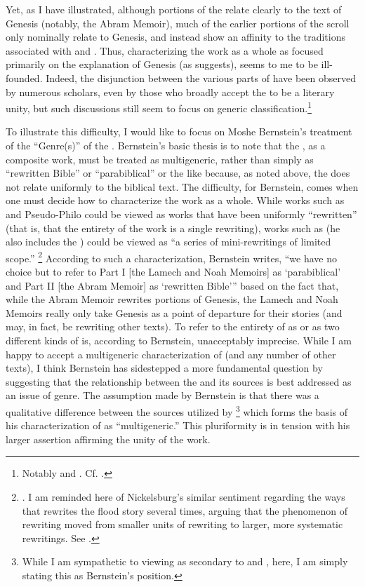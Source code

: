 Yet, as I have illustrated, although portions of the \ga relate clearly to the text of Genesis (notably, the Abram Memoir), much of the earlier portions of the scroll only nominally relate to Genesis, and instead show an affinity to the traditions associated with \firstenoch and \jub. Thus, characterizing the work as a whole as focused primarily on the explanation of Genesis (as \vermes suggests), seems to me to be ill-founded. Indeed, the disjunction between the various parts of \ga have been observed by numerous scholars, even by those who broadly accept the \ga to be a literary unity, but such discussions still seem to focus on generic classification.\footnote{Notably \cite{bernstein_as2010} and \cite{falk2007}. Cf. \cite{eshel_roitman-etal2011}.}

To illustrate this difficulty, I would like to focus on Moshe Bernstein's treatment of the ``Genre(s)'' of the \ga.\autocite[As argued in][]{bernstein_berthelot-etal2010} Bernstein's basic thesis is to note that the \ga, as a composite work, must be treated as multigeneric, rather than simply as ``rewritten Bible'' or ``parabiblical'' or the like because, as noted above, the \ga does not relate uniformly to the biblical text. The difficulty, for Bernstein, comes when one must decide how to characterize the work as a whole. While works such as \jub and Pseudo-Philo could be viewed as works that have been uniformly ``rewritten'' (that is, that the entirety of the work is a single rewriting), works such as \ga (he also includes the \templescroll) could be viewed as ``a series of mini-rewritings of limited scope.''%
%
\footnote{\cite[336]{bernstein_berthelot-etal2010}. I am reminded here of Nickelsburg's similar sentiment regarding the ways that \firstenoch rewrites the flood story several times, arguing that the phenomenon of rewriting moved from smaller units of rewriting to larger, more systematic rewritings. See \cite[89--90]{nickelsburg_stone1984}.}
%
According to such a characterization, Bernstein writes, ``we have no choice but to refer to Part I [the Lamech and Noah Memoirs] as `parabiblical' and Part II [the Abram Memoir] as `rewritten Bible''' based on the fact that, while the Abram Memoir rewrites portions of Genesis, the Lamech and Noah Memoirs really only take Genesis as a point of departure for their stories (and may, in fact, be rewriting other texts).\autocite[337]{bernstein_berthelot-etal2010} To refer to the entirety of \ga as \rwb or as two different kinds of \rwb is, according to Bernstein, unacceptably imprecise. While I am happy to accept a multigeneric characterization of \ga (and any number of other texts), I think Bernstein has sidestepped a more fundamental question by suggesting that the relationship between the \ga and its sources is best addressed as an issue of genre. The assumption made by Bernstein is that there was a qualitative difference between the sources utilized by \ga\footnote{While I am sympathetic to viewing \ga as secondary to \jub and \firstenoch, here, I am simply stating this as Bernstein's position.} which forms the basis of his characterization of \ga as ``multigeneric.'' This pluriformity is in tension with his larger assertion affirming the unity of the work. 

